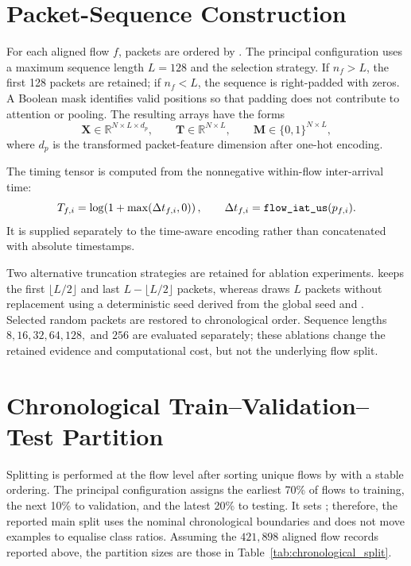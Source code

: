 \documentclass[11pt,fleqn]{report}
\begin{document}
\section{Packet-Sequence Construction}
\label{subsec:sequence_construction}

For each aligned flow $f$, packets are ordered by . The principal configuration uses a maximum sequence length $L=128$ and the  selection strategy. If $n_f>L$, the first 128 packets are retained; if $n_f<L$, the sequence is right-padded with zeros. A Boolean mask identifies valid positions so that padding does not contribute to attention or pooling. The resulting arrays have the forms
\begin{equation}
    \mathbf{X}\in\mathbb{R}^{N\times L\times d_p},\qquad
    \mathbf{T}\in\mathbb{R}^{N\times L},\qquad
    \mathbf{M}\in\{0,1\}^{N\times L},
    \label{eq:stage1_tensor_shapes}
\end{equation}
where $d_p$ is the transformed packet-feature dimension after one-hot encoding.

The timing tensor is computed from the nonnegative within-flow inter-arrival time:
\begin{equation}
    T_{f,i}=\log\!\left(1+\max(\Delta t_{f,i},0)\right),
    \qquad
    \Delta t_{f,i}=\datasetfield{flow_iat_us}(p_{f,i}).
    \label{eq:time_tensor}
\end{equation}
It is supplied separately to the time-aware encoding rather than concatenated with absolute timestamps.

Two alternative truncation strategies are retained for ablation experiments.  keeps the first $\lfloor L/2\rfloor$ and last $L-\lfloor L/2\rfloor$ packets, whereas  draws $L$ packets without replacement using a deterministic seed derived from the global seed and . Selected random packets are restored to chronological order. Sequence lengths $8,16,32,64,128,$ and $256$ are evaluated separately; these ablations change the retained evidence and computational cost, but not the underlying flow split.

\section{Chronological Train--Validation--Test Partition}
\label{subsec:chronological_partition}

Splitting is performed at the flow level after sorting unique flows by  with a stable ordering. The principal configuration assigns the earliest 70\% of flows to training, the next 10\% to validation, and the latest 20\% to testing. It sets ; therefore, the reported main split uses the nominal chronological boundaries and does not move examples to equalise class ratios. Assuming the $421{,}898$ aligned flow records reported above, the partition sizes are those in Table~\ref{tab:chronological_split}.
\end{document}
